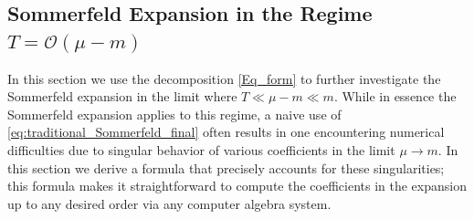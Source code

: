 \documentclass[sn-mathphys,Numbered]{sn-jnl}
\begin{document}
\subsection{Sommerfeld Expansion in the Regime $T=\mathcal{O}(\mu-m)$}\label{sec:asymp_T_0_faster}

In this section we use the decomposition \eqref{Eq_form} to further investigate the Sommerfeld expansion   in the limit where $T\ll\mu-m\ll m$.  While in essence the Sommerfeld expansion applies to this regime, a naive use of \eqref{eq:traditional_Sommerfeld_final} often results in one encountering numerical difficulties due to singular behavior of various coefficients in the limit $\mu\to m$.  In this section we derive a formula that precisely accounts for these singularities; this formula makes it straightforward   to  compute the coefficients in the expansion up to any desired order via any computer algebra system.
\end{document}
